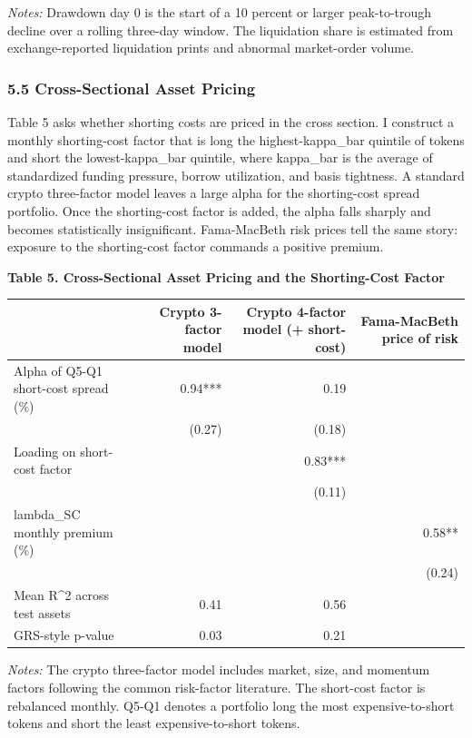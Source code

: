 \documentclass[
]{article}
\newcounter{none} %
\begin{document}
\emph{Notes:} Drawdown day 0 is the start of a 10 percent or larger
peak-to-trough decline over a rolling three-day window. The liquidation
share is estimated from exchange-reported liquidation prints and
abnormal market-order volume.

\subsubsection{5.5 Cross-Sectional Asset
Pricing}\label{55-cross-sectional-asset-pricing}

Table 5 asks whether shorting costs are priced in the cross section. I
construct a monthly shorting-cost factor that is long the
highest-kappa\_bar quintile of tokens and short the lowest-kappa\_bar
quintile, where kappa\_bar is the average of standardized funding
pressure, borrow utilization, and basis tightness. A standard crypto
three-factor model leaves a large alpha for the shorting-cost spread
portfolio. Once the shorting-cost factor is added, the alpha falls
sharply and becomes statistically insignificant. Fama-MacBeth risk
prices tell the same story: exposure to the shorting-cost factor
commands a positive premium.

\textbf{Table 5. Cross-Sectional Asset Pricing and the Shorting-Cost
Factor}

{\def\LTcaptype{none} %
\begin{longtable}[]{@{}lrrr@{}}
\toprule\noalign{}
& Crypto 3-factor model & Crypto 4-factor model (+ short-cost) &
Fama-MacBeth price of risk \\
\midrule\noalign{}
\endhead
\bottomrule\noalign{}
\endlastfoot
Alpha of Q5-Q1 short-cost spread (\%) & 0.94*** & 0.19 & \\
& (0.27) & (0.18) & \\
Loading on short-cost factor & & 0.83*** & \\
& & (0.11) & \\
lambda\_SC monthly premium (\%) & & & 0.58** \\
& & & (0.24) \\
Mean R\^{}2 across test assets & 0.41 & 0.56 & \\
GRS-style p-value & 0.03 & 0.21 & \\
\end{longtable}
}

\emph{Notes:} The crypto three-factor model includes market, size, and
momentum factors following the common risk-factor literature. The
short-cost factor is rebalanced monthly. Q5-Q1 denotes a portfolio long
the most expensive-to-short tokens and short the least
expensive-to-short tokens.
\end{document}
